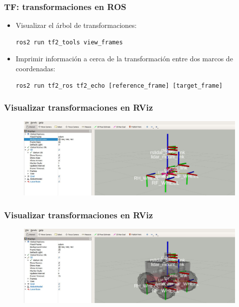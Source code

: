 \begin{frame}[fragile]
    \frametitle{TF: transformaciones en ROS}
    
    \begin{itemize}
        \item Visualizar el árbol de transformaciones:
        \begin{lstlisting}[style=bash] 
ros2 run tf2_tools view_frames
        \end{lstlisting}

        \item Imprimir información a cerca de la transformación entre dos marcos de coordenadas:
        \begin{lstlisting}[style=bash] 
ros2 run tf2_ros tf2_echo [reference_frame] [target_frame]
        \end{lstlisting}
    \end{itemize}

\end{frame}

\begin{frame}
	\frametitle{Visualizar transformaciones en RViz}
	
   	\begin{figure}[!h]
		\centering
			\includegraphics[width=\columnwidth]{images/tf2_tree_rviz.png}
	\end{figure}
	
\end{frame}

\begin{frame}
	\frametitle{Visualizar transformaciones en RViz}
	\begin{figure}[!h]
		\centering
		\includegraphics[width=\columnwidth]{images/tf2_tree_robot_rviz.png}
	\end{figure}
	
\end{frame}

